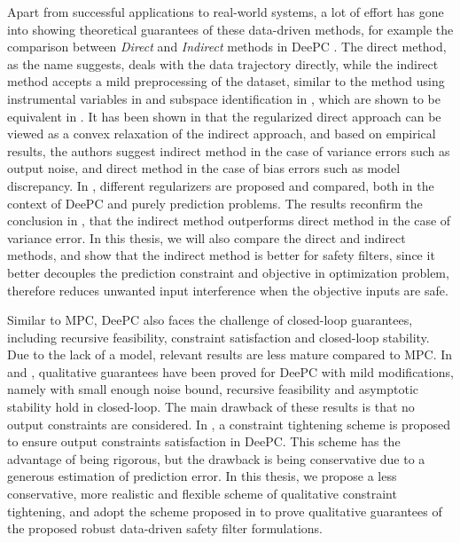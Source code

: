 Apart from successful applications to real-world systems, a lot of effort has gone into showing theoretical guarantees of these data-driven methods, for example the comparison between \emph{Direct} and \emph{Indirect} methods in DeePC \cite{dorflerBridgingDirectIndirect2023}.
The direct method, as the name suggests, deals with the data trajectory directly, while the indirect method accepts a mild preprocessing of the dataset, similar to the method using instrumental variables in \cite{soderstromInstrumentalVariableMethods2002} and subspace identification in \cite{favoreelSPCSubspacePredictive1999}, which are shown to be equivalent in \cite{vanwingerdenInstrumentVar2022}.
It has been shown in \cite{dorflerBridgingDirectIndirect2023} that the regularized direct approach can be viewed as a convex relaxation of the indirect approach, and based on empirical results, the authors suggest indirect method in the case of variance errors such as output noise, and direct method in the case of bias errors such as model discrepancy.
In \cite{mattssonRegularizationDeePC}, different regularizers are proposed and compared, both in the context of DeePC and purely prediction problems.
The results reconfirm the conclusion in \cite{dorflerBridgingDirectIndirect2023}, that the indirect method outperforms direct method in the case of variance error.
In this thesis, we will also compare the direct and indirect methods, and show that the indirect method is better for safety filters, since it better decouples the prediction constraint and objective in optimization problem, therefore reduces unwanted input interference when the objective inputs are safe.

Similar to MPC, DeePC also faces the challenge of closed-loop guarantees, including recursive feasibility, constraint satisfaction and closed-loop stability.
Due to the lack of a model, relevant results are less mature compared to MPC.
In \cite{berberichDataDrivenRobust2021} and \cite{berberichStabilityInnerRobust2022IEEE}, qualitative guarantees have been proved for DeePC with mild modifications, namely with small enough noise bound, recursive feasibility and asymptotic stability hold in closed-loop.
The main drawback of these results is that no output constraints are considered.
In \cite{berberichRobustConstraintSatisfaction2020}, a constraint tightening scheme is proposed to ensure output constraints satisfaction in DeePC.
This scheme has the advantage of being rigorous, but the drawback is being conservative due to a generous estimation of prediction error.
In this thesis, we propose a less conservative, more realistic and flexible scheme of qualitative constraint tightening, and adopt the scheme proposed in \cite{berberichRobustConstraintSatisfaction2020} to prove qualitative guarantees of the proposed robust data-driven safety filter formulations.

